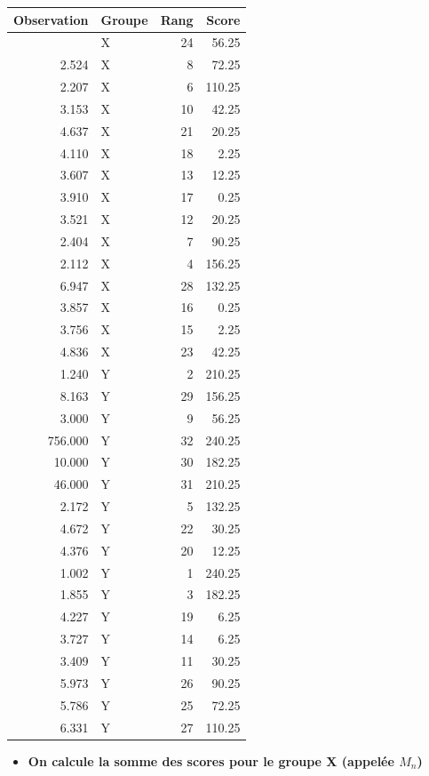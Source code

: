\documentclass[
  12pt,
]{article}
\providecommand{\tightlist}{%
  \setlength{\itemsep}{0pt}\setlength{\parskip}{0pt}}
\begin{document}
\begin{longtable}[]{@{}rlrr@{}}
\toprule\noalign{}
Observation & Groupe & Rang & Score \\
\midrule\noalign{}
\endhead
\bottomrule\noalign{}
\endlastfoot
4.953 & X & 24 & 56.25 \\
2.524 & X & 8 & 72.25 \\
2.207 & X & 6 & 110.25 \\
3.153 & X & 10 & 42.25 \\
4.637 & X & 21 & 20.25 \\
4.110 & X & 18 & 2.25 \\
3.607 & X & 13 & 12.25 \\
3.910 & X & 17 & 0.25 \\
3.521 & X & 12 & 20.25 \\
2.404 & X & 7 & 90.25 \\
2.112 & X & 4 & 156.25 \\
6.947 & X & 28 & 132.25 \\
3.857 & X & 16 & 0.25 \\
3.756 & X & 15 & 2.25 \\
4.836 & X & 23 & 42.25 \\
1.240 & Y & 2 & 210.25 \\
8.163 & Y & 29 & 156.25 \\
3.000 & Y & 9 & 56.25 \\
756.000 & Y & 32 & 240.25 \\
10.000 & Y & 30 & 182.25 \\
46.000 & Y & 31 & 210.25 \\
2.172 & Y & 5 & 132.25 \\
4.672 & Y & 22 & 30.25 \\
4.376 & Y & 20 & 12.25 \\
1.002 & Y & 1 & 240.25 \\
1.855 & Y & 3 & 182.25 \\
4.227 & Y & 19 & 6.25 \\
3.727 & Y & 14 & 6.25 \\
3.409 & Y & 11 & 30.25 \\
5.973 & Y & 26 & 90.25 \\
5.786 & Y & 25 & 72.25 \\
6.331 & Y & 27 & 110.25 \\
\end{longtable}

\begin{itemize}
\tightlist
\item
  \textbf{On calcule la somme des scores pour le groupe X (appelée
  \(M_n\))}
\end{itemize}
\end{document}
